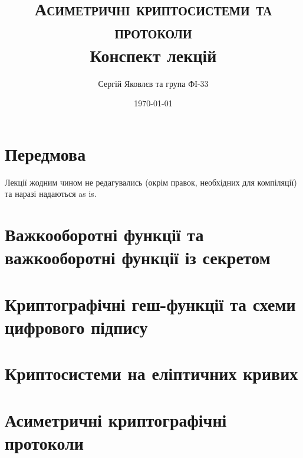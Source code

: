 \documentclass[12pt]{report}
\title{\textsc{Асиметричні криптосистеми та протоколи} \\ Конспект лекцій}
\author{Сергій Яковлєв та група ФІ-33}
\date{\today}
\theoremstyle{plain}
\theoremstyle{definition}
\theoremstyle{remark}
\begin{document}
\maketitle
\tableofcontents
\clearpage

\chapter*{Передмова}

Лекції жодним чином не редагувались (окрім правок, необхідних для компіляції) та наразі надаються as is.

\chapter{Важкооборотні функції та важкооборотні функції із секретом}


\chapter{Криптографічні геш-функції та схеми цифрового підпису}


\chapter{Криптосистеми на еліптичних кривих}


\chapter{Асиметричні криптографічні протоколи}

\end{document}

